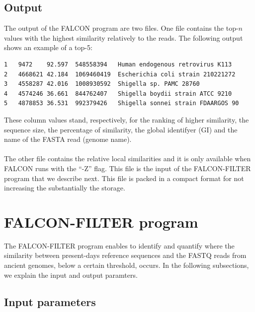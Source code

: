\documentclass[11pt,journal,compsoc]{report}[1]
\begin{document}
\subsection*{Output}

The output of the FALCON program are two files. One file contains the top-$n$ 
values with the highest similarity relatively to the reads. The following 
output shows an example of a top-5:
\begin{lstlisting}
1	9472	92.597	548558394	Human endogenous retrovirus K113
2	4668621	42.184	1069460419	Escherichia coli strain 210221272
3	4558287	42.016	1008930592	Shigella sp. PAMC 28760
4	4574246	36.661	844762407	Shigella boydii strain ATCC 9210
5	4878853	36.531	992379426	Shigella sonnei strain FDAARGOS 90
\end{lstlisting} 
These column values stand, respectively, for the ranking of higher similarity, 
the sequence size, the percentage of similarity, the global identifyer (GI) and
the name of the FASTA read (genome name).\\
~\\
The other file contains the relative local similarities and it is only 
available when FALCON runs with the ``-Z'' flag. This file is the input of
the FALCON-FILTER program that we describe next. This file is packed in 
a compact format for not increasing the substantially the storage.

\section*{FALCON-FILTER program}

The FALCON-FILTER program enables to identify and quantify where the 
similarity between present-days reference sequences and the FASTQ reads 
from ancient genomes, below a certain threshold, occurs.
In the following subsections, we explain the input and output paramters.

\subsection*{Input parameters}
\end{document}
